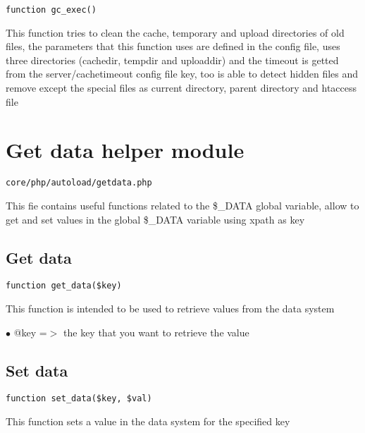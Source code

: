 \documentclass[a4paper]{book}
\begin{document}
\begin{lstlisting}
function gc_exec()
\end{lstlisting}

This function tries to clean the cache, temporary and upload directories
of old files, the parameters that this function uses are defined in the
config file, uses three directories (cachedir, tempdir and uploaddir) and
the timeout is getted from the server/cachetimeout config file key, too
is able to detect hidden files and remove except the special files as
current directory, parent directory and htaccess file

\hypertarget{toc136}{}
\section{Get data helper module}

\begin{lstlisting}
core/php/autoload/getdata.php
\end{lstlisting}

This fie contains useful functions related to the \$\_DATA global variable, allow to get and set
values in the global \$\_DATA variable using xpath as key

\hypertarget{toc137}{}
\subsection{Get data}

\begin{lstlisting}
function get_data($key)
\end{lstlisting}

This function is intended to be used to retrieve values from the
data system

\begin{compactitem}
\item[\color{myblue}$\bullet$] @key =$>$ the key that you want to retrieve the value
\end{compactitem}

\hypertarget{toc138}{}
\subsection{Set data}

\begin{lstlisting}
function set_data($key, $val)
\end{lstlisting}

This function sets a value in the data system for the specified key
\end{document}
